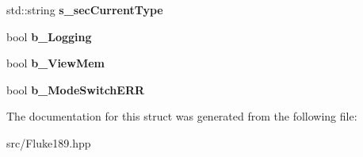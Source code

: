\begin{DoxyCompactItemize}
\item 
\hypertarget{structFluke_1_1Fluke189_1_1analysedInfo__t_aa29352d43d32817cb8acb61573f8ff6d}{
std::string {\bfseries s\_\-secCurrentType}}
\label{structFluke_1_1Fluke189_1_1analysedInfo__t_aa29352d43d32817cb8acb61573f8ff6d}

\item 
\hypertarget{structFluke_1_1Fluke189_1_1analysedInfo__t_a9c15bb92c962737fd32e91df1f6e2458}{
bool {\bfseries b\_\-Logging}}
\label{structFluke_1_1Fluke189_1_1analysedInfo__t_a9c15bb92c962737fd32e91df1f6e2458}

\item 
\hypertarget{structFluke_1_1Fluke189_1_1analysedInfo__t_a7b35a7dc891163c90e57cdf16b132f0e}{
bool {\bfseries b\_\-ViewMem}}
\label{structFluke_1_1Fluke189_1_1analysedInfo__t_a7b35a7dc891163c90e57cdf16b132f0e}

\item 
\hypertarget{structFluke_1_1Fluke189_1_1analysedInfo__t_a41ae808574c9044a2c2e7b5ec9137b09}{
bool {\bfseries b\_\-ModeSwitchERR}}
\label{structFluke_1_1Fluke189_1_1analysedInfo__t_a41ae808574c9044a2c2e7b5ec9137b09}

\end{DoxyCompactItemize}


The documentation for this struct was generated from the following file:\begin{DoxyCompactItemize}
\item 
src/Fluke189.hpp\end{DoxyCompactItemize}
